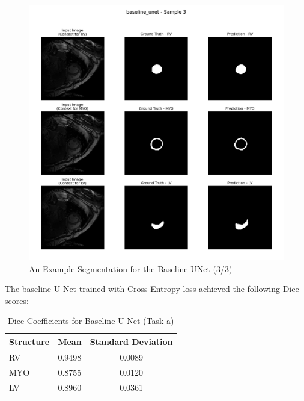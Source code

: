 \documentclass{article}
\begin{document}
\begin{figure}[H]
  \centering
  \includegraphics[width=\linewidth]{../result/baseline_unet/sample_3_segmentation.png}
  \caption{An Example Segmentation for the Baseline UNet (3/3)}
  \label{fig:baseline_unet_segmentation_example3}
\end{figure}

The baseline U-Net trained with Cross-Entropy loss achieved the following Dice scores:
\begin{table}[H]
\centering
\caption{Dice Coefficients for Baseline U-Net (Task a)}
\label{tab:baseline_unet}
\begin{tabular}{lcc}
\toprule
Structure & Mean      & Standard Deviation \\
\midrule
RV        & 0.9498    & 0.0089             \\
MYO       & 0.8755    & 0.0120             \\
LV        & 0.8960    & 0.0361             \\
\bottomrule
\end{tabular}
\end{table}
\end{document}
